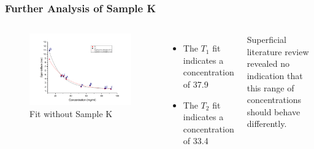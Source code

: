 \begin{frame}
    \frametitle{Further Analysis of Sample K}
    \begin{columns}
            \column[t]{5cm}
            \begin{figure}
                    \begin{center}
                            \includegraphics[scale=0.17]{./images/figures/res_k/res_w-out_k.jpg}
                    \end{center}
                            \caption{Fit without Sample K}
                    \label{fig:w-out_k}
            \end{figure}
            \column[t]{5cm}
                \begin{itemize}
                        \item The $T_1$ fit indicates a concentration of 37.9
                        \item The $T_2$ fit indicates a concentration of 33.4
                \end{itemize}
            Superficial literature review revealed no indication that this range of concentrations should behave differently.
          \end{columns}
\end{frame}
